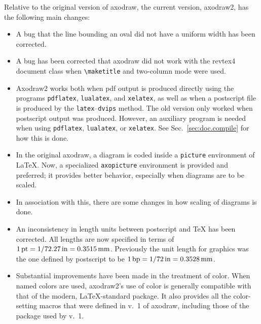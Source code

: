 \documentclass[12pt]{article}
\def\program#1{\texttt{#1}}
\begin{document}
Relative to the original version of axodraw, the current version,
axodraw2, has the following main changes:
\begin{itemize}

\item A bug that the line bounding an oval did not have a uniform
  width has been corrected.

\item A bug has been corrected that axodraw did not work with the
  revtex4 document class when \verb+\maketitle+ and two-column mode
  were used.

\item Axodraw2 works both when pdf output is produced directly using
  the programs \program{pdflatex}, \program{lualatex}, and
  \program{xelatex}, as well as when a postscript file is produced by
  the \program{latex}--\program{dvips} method.  The old version only
  worked when postscript output was produced.  However, an auxiliary
  program is needed when using \program{pdflatex}, \program{lualatex},
  or \program{xelatex}.  See Sec.\ \ref{sec:doc.compile} for how this
  is done.

\item In the original axodraw, a diagram is coded inside a
  \verb+picture+ environment of \LaTeX.  Now, a specialized
  \verb+axopicture+ environment is provided and preferred; it provides
  better behavior, especially when diagrams are to be scaled.

\item In association with this, there are some changes in how scaling
  of diagrams is done.

\item An inconsistency in length units between postscript and \TeX{}
  has been corrected.  All lengths are now specified in terms of
  $\unit[1]{pt} = \unit[1/72.27]{in} = \unit[0.3515]{mm}$.  Previously
  the unit length for graphics was the one defined by postscript to be 
  $\unit[1]{bp} = \unit[1/72]{in} = \unit[0.3528]{mm}$.

\item Substantial improvements have been made in the treatment of
  color.  When named colors are used, axodraw2's use of color is
  generally compatible with that of the modern, \LaTeX-standard
   package.  It also provides all the color-setting
  macros that were defined in v.\ 1 of axodraw, including those of the
   package used by v.\ 1.


\end{itemize}
\end{document}
